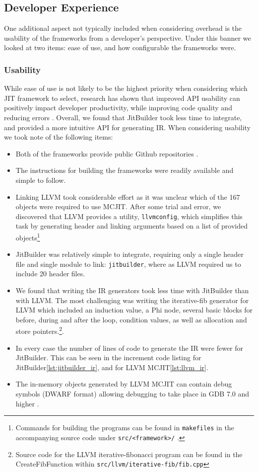 \subsection{Developer Experience}
One additional aspect not typically included when considering overhead is the usability of the frameworks from a developer's perspective.
Under this banner we looked at two items: ease of use, and how configurable the frameworks were.

\subsubsection{Usability}
While ease of use is not likely to be the highest priority when considering which JIT framework to select, research has shown that improved API usability can positively impact developer productivity, while improving code quality and reducing errors \cite{apiUsability}.
Overall, we found that JitBuilder took less time to integrate, and provided a more intuitive API for generating IR.
When considering usability we took note of the following items:
\begin{itemize}
  \item Both of the frameworks provide public Github repositories \cite{llvmGithub,jitbuilderGithub}.
  \item The instructions for building the frameworks were readily available and simple to follow.
  \item Linking LLVM took considerable effort as it was unclear which of the 167 objects were required to use MCJIT. 
  After some trial and error, we discovered that LLVM provides a utility, \texttt{llvmconfig}, which simplifies this task by generating header and linking arguments based on a list of provided objects\footnote{Commands for building the programs can be found in \texttt{makefiles} in the accompanying source code under \texttt{src/<framework>/} \cite{projectGithub}.} 
  \item JitBuilder was relatively simple to integrate, requiring only a single header file and single module to link: \texttt{jitbuilder}, where as LLVM required us to include 20 header files.
  \item We found that writing the IR generators took less time with JitBuilder than with LLVM. 
  The most challenging was writing the iterative-fib generator for LLVM which included an induction value, a Phi node, several basic blocks for before, during and after the loop, condition values, as well as allocation and store pointers.\footnote{Source code for the LLVM iterative-fibonacci program can be found in the CreateFibFunction within \texttt{src/llvm/iterative-fib/fib.cpp}}.
  \item In every case the number of lines of code to generate the IR were fewer for JitBuilder. 
  This can be seen in the increment code listing for JitBuilder\ref{lst:jitbuilder_ir}, and for LLVM MCJIT\ref{lst:llvm_ir}.
  \item The in-memory objects generated by LLVM MCJIT can contain debug symbols (DWARF format) allowing debugging to take place in GDB 7.0 and higher \cite{llvmDebugJIT}.
\end{itemize}

